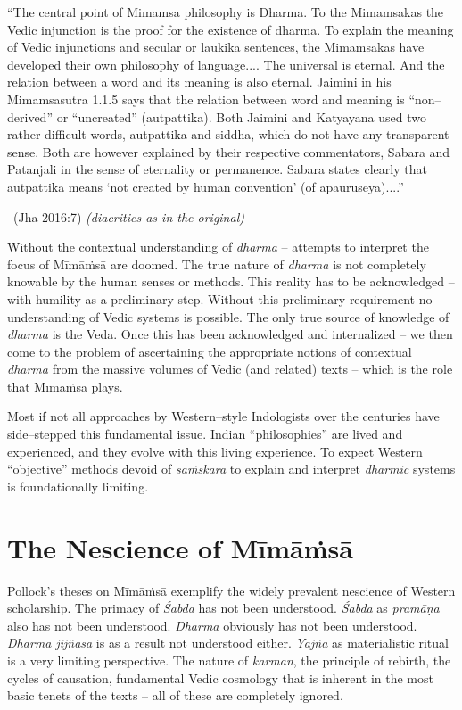 \begin{myquote}
“The central point of Mimamsa philosophy is Dharma. To the Mimamsakas the Vedic injunction is the proof for the existence of dharma. To explain the meaning of Vedic injunctions and secular or laukika sentences, the Mimamsakas have developed their own philosophy of language.... The universal is eternal. And the relation between a word and its meaning is also eternal. Jaimini in his Mimamsasutra 1.1.5 says that the relation between word and meaning is “non–derived” or “uncreated” (autpattika). Both Jaimini and Katyayana used two rather difficult words, autpattika and siddha, which do not have any transparent sense. Both are however explained by their respective commentators, Sabara and Patanjali in the sense of eternality or permanence. Sabara states clearly that autpattika means ‘not created by human convention’ (of apauruseya)....” 

~\hfill (Jha 2016:7) \textit{(diacritics as in the original)}
\end{myquote}

Without the contextual understanding of \textit{dharma} – attempts to interpret the focus of Mīmāṁsā are doomed. The true nature of \textit{dharma} is not completely knowable by the human senses or methods. This reality has to be acknowledged – with humility as a preliminary step. Without this preliminary requirement no understanding of Vedic systems is possible. The only true source of knowledge of \textit{dharma} is the Veda. Once this has been acknowledged and internalized – we then come to the problem of ascertaining the appropriate notions of contextual \textit{dharma} from the massive volumes of Vedic (and related) texts – which is the role that Mīmāṁsā plays.

Most if not all approaches by Western–style Indologists over the centuries have side–stepped this fundamental issue. Indian “philosophies” are lived and experienced, and they evolve with this living experience. To expect Western “objective” methods devoid of \textit{saṁskāra} to explain and interpret \textit{dhārmic} systems is foundationally limiting.


\section*{The Nescience of Mīmāṁsā}

Pollock’s theses on Mīmāṁsā exemplify the widely prevalent nescience of Western scholarship. The primacy of \textit{Śabda} has not been understood. \textit{Śabda} as \textit{pramāṇa} also has not been understood. \textit{Dharma} obviously has not been understood. \textit{Dharma jijñāsā} is as a result not understood either. \textit{Yajña} as materialistic ritual is a very limiting perspective. The nature of \textit{karman}, the principle of rebirth, the cycles of causation, fundamental Vedic cosmology that is inherent in the most basic tenets of the texts – all of these are completely ignored.

